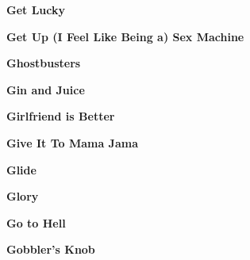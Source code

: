 \vspace{10pt} 
\begin{center}\textbf{Get Lucky}\end{center}
\newline
\vspace{10pt} 
\begin{center}\textbf{Get Up (I Feel Like Being a) Sex Machine}\end{center}
\newline
\vspace{10pt} 
\begin{center}\textbf{Ghostbusters}\end{center}
\newline
\vspace{10pt} 
\begin{center}\textbf{Gin and Juice}\end{center}
\newline
\vspace{10pt} 
\begin{center}\textbf{Girlfriend is Better}\end{center}
\newline
\vspace{10pt} 
\begin{center}\textbf{Give It To Mama Jama}\end{center}
\newline
\vspace{10pt} 
\begin{center}\textbf{Glide}\end{center}
\newline
\vspace{10pt} 
\begin{center}\textbf{Glory}\end{center}
\newline
\vspace{10pt} 
\begin{center}\textbf{Go to Hell}\end{center}
\newline
\vspace{10pt} 
\begin{center}\textbf{Gobbler's Knob}\end{center}
